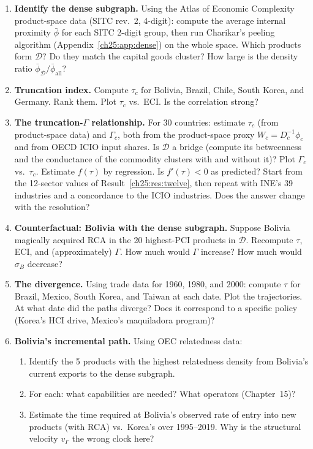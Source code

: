 \documentclass[../structural_economics_book.tex]{subfiles}
\begin{document}
\begin{enumerate}[label=\textbf{25.\arabic*}, leftmargin=3em]

\item \textbf{Identify the dense subgraph.} Using the Atlas of Economic Complexity product-space data (SITC rev.~2, 4-digit): compute the average internal proximity $\bar{\phi}$ for each SITC 2-digit group, then run Charikar's peeling algorithm (Appendix~\ref{ch25:app:dense}) on the whole space. Which products form $\mathcal{D}$? Do they match the capital goods cluster? How large is the density ratio $\bar{\phi}_{\mathcal{D}}/\bar{\phi}_{\text{all}}$?

\item \textbf{Truncation index.} Compute $\tau_c$ for Bolivia, Brazil, Chile, South Korea, and Germany. Rank them. Plot $\tau_c$ vs.\ ECI. Is the correlation strong?

\item \textbf{The truncation-$\Gamma$ relationship.} For 30 countries: estimate $\tau_c$ (from product-space data) and $\Gamma_c$, both from the product-space proxy $W_c = D_c^{-1}\phi_c$ and from OECD ICIO input shares. Is $\mathcal{D}$ a bridge (compute its betweenness and the conductance of the commodity clusters with and without it)? Plot $\Gamma_c$ vs.\ $\tau_c$. Estimate $f(\tau)$ by regression. Is $f'(\tau) < 0$ as predicted? Start from the 12-sector values of Result~\ref{ch25:res:twelve}, then repeat with INE's 39 industries and a concordance to the ICIO industries. Does the answer change with the resolution?

\item \textbf{Counterfactual: Bolivia with the dense subgraph.} Suppose Bolivia magically acquired RCA in the 20 highest-PCI products in $\mathcal{D}$. Recompute $\tau$, ECI, and (approximately) $\Gamma$. How much would $\Gamma$ increase? How much would $\sigma_B$ decrease?

\item \textbf{The divergence.} Using trade data for 1960, 1980, and 2000: compute $\tau$ for Brazil, Mexico, South Korea, and Taiwan at each date. Plot the trajectories. At what date did the paths diverge? Does it correspond to a specific policy (Korea's HCI drive, Mexico's maquiladora program)?

\item \textbf{Bolivia's incremental path.} Using OEC relatedness data:
\begin{enumerate}
\item Identify the 5 products with the highest relatedness density from Bolivia's current exports to the dense subgraph.
\item For each: what capabilities are needed? What operators (Chapter~15)?
\item Estimate the time required at Bolivia's observed rate of entry into new products (with RCA) vs.\ Korea's over 1995--2019. Why is the structural velocity $v_\Gamma$ the wrong clock here?
\end{enumerate}


\end{enumerate}
\end{document}
